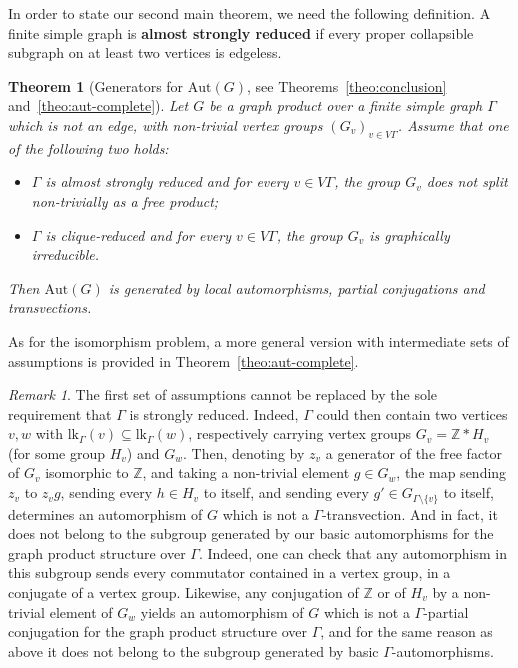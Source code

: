\documentclass[a4paper,english,11pt]{article}
\newtheorem{theo}[de]{Theorem}
\theoremstyle{definition}
\theoremstyle{remark}
\newtheorem{rk}[de]{Remark}
\newcommand{\lk}{\mathrm{lk}}
\newcommand{\Aut}{\mathrm{Aut}}
\newcommand{\deffont}[1]{\textbf{#1}}
\begin{document}
In order to state our second main theorem, we need the following definition. A finite simple graph is \deffont{almost strongly reduced} if every proper collapsible subgraph on at least two vertices is edgeless.


\begin{theo}[Generators for $\Aut(G)$, see Theorems~\ref{theo:conclusion} and~\ref{theo:aut-complete}]%
\label{theo:main-aut}
Let $G$ be a graph product over a finite simple graph $\Gamma$ which is not an edge, with non-trivial vertex groups $(G_v)_{v\in V\Gamma}$. Assume that one of the following two holds:
\begin{itemize}
\item $\Gamma$ is almost strongly reduced and for every $v\in V\Gamma$, the group $G_v$ does not split non-trivially as a free product;
\item $\Gamma$ is clique-reduced and for every $v\in V\Gamma$, the group $G_v$ is graphically irreducible.
\end{itemize}
Then $\Aut(G)$ is generated by local automorphisms, partial conjugations and transvections.
\end{theo}

As for the isomorphism problem, a more general version with intermediate sets of assumptions is provided in Theorem~\ref{theo:aut-complete}.

\begin{rk}\label{rk:aut}
The first set of assumptions cannot be replaced by the sole requirement that $\Gamma$ is strongly reduced. Indeed, $\Gamma$ could then contain two vertices $v,w$ with $\lk_\Gamma(v)\subseteq\lk_\Gamma(w)$, respectively carrying vertex groups $G_v=\mathbb{Z}\ast H_v$ (for some group $H_v$) and $G_w$. Then, denoting by $z_v$ a generator of the free factor of $G_v$ isomorphic to $\mathbb{Z}$, and taking a non-trivial element $g\in G_w$, the map sending $z_v$ to $z_vg$, sending every $h\in H_v$ to itself, and sending every $g'\in G_{\Gamma\setminus\{v\}}$ to itself, determines an automorphism of $G$ which is not a $\Gamma$-transvection. And in fact, it does not belong to the subgroup generated by our basic automorphisms for the graph product structure over $\Gamma$. Indeed, one can check that any automorphism in this subgroup sends every commutator contained in a vertex group, in a conjugate of a vertex group. Likewise, any conjugation of $\mathbb{Z}$ or of $H_v$ by a non-trivial element of $G_w$ yields an automorphism of $G$ which is not a $\Gamma$-partial conjugation for the graph product structure over $\Gamma$, and for the same reason as above it does not belong to the subgroup generated by basic $\Gamma$-automorphisms.
\end{rk}
\end{document}
